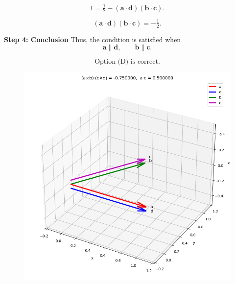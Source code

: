 \documentclass[journal]{IEEEtran}
\begin{document}
\begin{equation}
1 = \tfrac12 - (\mathbf{a} \cdot \mathbf{d})(\mathbf{b} \cdot \mathbf{c}).
\end{equation}

\begin{equation}
(\mathbf{a} \cdot \mathbf{d})(\mathbf{b} \cdot \mathbf{c}) = -\tfrac12.
\end{equation}

\textbf{Step 4: Conclusion}
Thus, the condition is satisfied when
\begin{equation}
\mathbf{a} \parallel \mathbf{d}, 
\qquad 
\mathbf{b} \parallel \mathbf{c}.
\end{equation}

\[
\boxed{\text{Option (D) is correct.}}
\]


\begin{figure}[H]
\begin{center}
\includegraphics[width=0.6\columnwidth]{figs/fig5.png}
\end{center}
\caption{}
\label{fig:Fig}
\end{figure}
\end{document}
